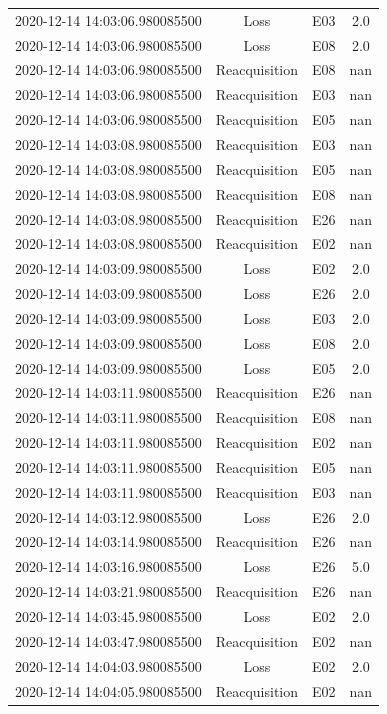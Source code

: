 \begin{enumerate}
\begin{longtabu}{cccc}
2020{-}12{-}14 14:03:06.980085500&Loss&E03&2.0\\%
2020{-}12{-}14 14:03:06.980085500&Loss&E08&2.0\\%
2020{-}12{-}14 14:03:06.980085500&Reacquisition&E08&nan\\%
2020{-}12{-}14 14:03:06.980085500&Reacquisition&E03&nan\\%
2020{-}12{-}14 14:03:06.980085500&Reacquisition&E05&nan\\%
2020{-}12{-}14 14:03:08.980085500&Reacquisition&E03&nan\\%
2020{-}12{-}14 14:03:08.980085500&Reacquisition&E05&nan\\%
2020{-}12{-}14 14:03:08.980085500&Reacquisition&E08&nan\\%
2020{-}12{-}14 14:03:08.980085500&Reacquisition&E26&nan\\%
2020{-}12{-}14 14:03:08.980085500&Reacquisition&E02&nan\\%
2020{-}12{-}14 14:03:09.980085500&Loss&E02&2.0\\%
2020{-}12{-}14 14:03:09.980085500&Loss&E26&2.0\\%
2020{-}12{-}14 14:03:09.980085500&Loss&E03&2.0\\%
2020{-}12{-}14 14:03:09.980085500&Loss&E08&2.0\\%
2020{-}12{-}14 14:03:09.980085500&Loss&E05&2.0\\%
2020{-}12{-}14 14:03:11.980085500&Reacquisition&E26&nan\\%
2020{-}12{-}14 14:03:11.980085500&Reacquisition&E08&nan\\%
2020{-}12{-}14 14:03:11.980085500&Reacquisition&E02&nan\\%
2020{-}12{-}14 14:03:11.980085500&Reacquisition&E05&nan\\%
2020{-}12{-}14 14:03:11.980085500&Reacquisition&E03&nan\\%
2020{-}12{-}14 14:03:12.980085500&Loss&E26&2.0\\%
2020{-}12{-}14 14:03:14.980085500&Reacquisition&E26&nan\\%
2020{-}12{-}14 14:03:16.980085500&Loss&E26&5.0\\%
2020{-}12{-}14 14:03:21.980085500&Reacquisition&E26&nan\\%
2020{-}12{-}14 14:03:45.980085500&Loss&E02&2.0\\%
2020{-}12{-}14 14:03:47.980085500&Reacquisition&E02&nan\\%
2020{-}12{-}14 14:04:03.980085500&Loss&E02&2.0\\%
2020{-}12{-}14 14:04:05.980085500&Reacquisition&E02&nan\\%

\end{longtabu}
\end{enumerate}

